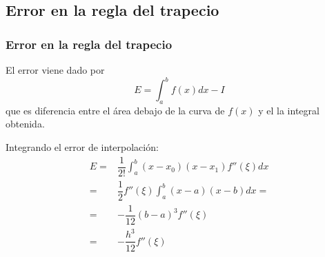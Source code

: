\subsection{Error en la regla del trapecio}
\begin{frame}
\frametitle{Error en la regla del trapecio}
El error viene dado por
\[ E = \int_{a}^{b} f(x) dx - I \]
que es diferencia entre el área debajo de la curva de $f(x)$ y el la integral obtenida. 
\end{frame}
\begin{frame}
Integrando el error de interpolación:
\[ \begin{split} 
E =& \dfrac{1}{2!} \int_{a}^{b} (x-x_{0})(x-x_{1}) f''(\xi) dx  \\
=& \dfrac{1}{2} f''(\xi) \int_{a}^{b} (x-a)(x-b) dx = \\
=& -\dfrac{1}{12}(b-a)^{3} f''(\xi) \\
=& -\dfrac{h^{3}}{12}f''(\xi) \\
\end{split} \]
\end{frame}
